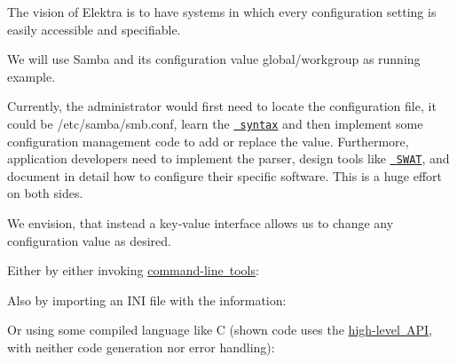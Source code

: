 The vision of Elektra is to have systems in which every configuration setting is easily accessible and specifiable.

We will use Samba and its configuration value {\ttfamily global/workgroup} as running example.

Currently, the administrator would first need to locate the configuration file, it could be {\ttfamily /etc/samba/smb.conf}, learn the \href{https://www.samba.org/samba/docs/current/man-html/smb.conf.5.html}{\texttt{ syntax}} and then implement some configuration management code to add or replace the value. Furthermore, application developers need to implement the parser, design tools like \href{https://www.samba.org/samba/docs/old/Samba3-HOWTO/SWAT.html}{\texttt{ S\+W\+AT}}, and document in detail how to configure their specific software. This is a huge effort on both sides.

We envision, that instead a key-\/value interface allows us to change any configuration value as desired.

Either by either invoking \mbox{\hyperlink{doc_help_kdb_md}{command-\/line tools}}\+:


\begin{DoxyCode}{0}
\end{DoxyCode}


Also by importing an I\+NI file with the information\+:


\begin{DoxyCode}{0}
\DoxyCodeLine{[global]}
\end{DoxyCode}


Or using some compiled language like C (shown code uses the \mbox{\hyperlink{src_libs_highlevel_README_md}{high-\/level A\+PI}}, with neither code generation nor error handling)\+:


\begin{DoxyCode}{0}
\DoxyCodeLine{}
\DoxyCodeLine{\{}
\DoxyCodeLine{\}}
\end{DoxyCode}


